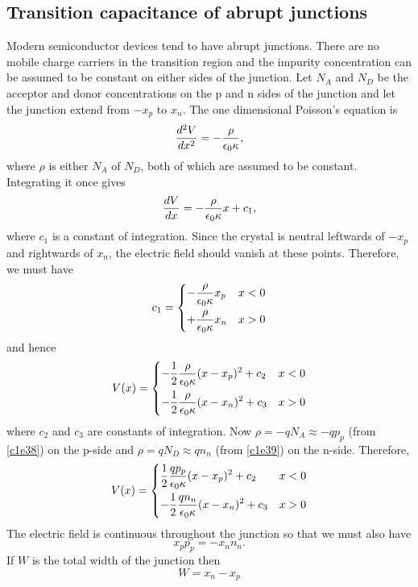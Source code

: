 \subsection{Transition capacitance of abrupt junctions}
Modern semiconductor devices tend to have abrupt junctions. There are no mobile
charge carriers in the transition region and the impurity concentration can be
assumed to be constant on either sides of the junction. Let $N_A$ and $N_D$ be
the acceptor and donor concentrations on the p and n sides of the junction and
let the junction extend from $-x_p$ to $x_n$. The one dimensional Poisson's 
equation is
\begin{equation}\label{c2e65}
\frac{d^2{V}}{d{x}^2} = -\frac{\rho}{\epsilon_0\kappa},
\end{equation}
where $\rho$ is either $N_A$ of $N_D$, both of which are assumed to be constant.
Integrating it once gives
\[
\frac{d{V}}{d{x}} = -\frac{\rho}{\epsilon_0\kappa}x + c_1,
\]
where $c_1$ is a constant of integration. Since the crystal is neutral leftwards
of $-x_p$ and rightwards of $x_n$, the electric field should vanish at these 
points. Therefore, we must have 
\[
c_1 = \begin{dcases}
-\frac{\rho}{\epsilon_0\kappa}x_p & x < 0 \\
+\frac{\rho}{\epsilon_0\kappa}x_n & x > 0
\end{dcases}
\]
and hence
\[
V(x) = \begin{dcases}
-\frac{1}{2}\frac{\rho}{\epsilon_0\kappa}(x - x_p)^2 + c_2 & x < 0 \\
-\frac{1}{2}\frac{\rho}{\epsilon_0\kappa}(x - x_n)^2 + c_3 & x > 0
\end{dcases}
\]
where $c_2$ and $c_3$ are constants of integration. Now $\rho = -qN_A \approx 
-qp_p$ (from \eqref{c1e38}) on the p-side and $\rho = qN_D \approx qn_n$ (from 
\eqref {c1e39}) on the n-side. Therefore,
\begin{equation}\label{c2e66}
V(x) = \begin{dcases}
 \frac{1}{2}\frac{qp_p}{\epsilon_0\kappa}(x - x_p)^2 + c_2 & x < 0 \\
-\frac{1}{2}\frac{qn_n}{\epsilon_0\kappa}(x - x_n)^2 + c_3 & x > 0
\end{dcases}
\end{equation}
The electric field is continuous throughout the junction so that we must also
have
\begin{equation}\label{c2e67}
x_pp_p = -x_nn_n.
\end{equation}
If $W$ is the total width of the junction then 
\begin{equation}\label{c2e68}
W = x_n - x_p
\end{equation}
